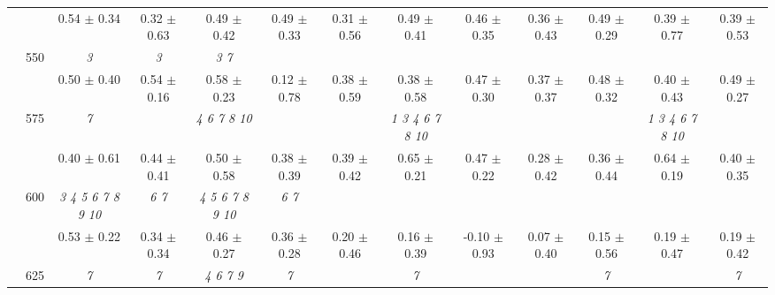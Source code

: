 \begin{table}[h]
{\begin{tabular}{
        ccccccccccccc}
 & & \cellcolor[HTML]{EFEFEF} 0.54 $\pm$ 0.34& \cellcolor[HTML]{EFEFEF} 0.32 $\pm$ 0.63& \cellcolor[HTML]{EFEFEF} 0.49 $\pm$ 0.42& \cellcolor[HTML]{EFEFEF} 0.49 $\pm$ 0.33& \cellcolor[HTML]{EFEFEF} 0.31 $\pm$ 0.56& \cellcolor[HTML]{EFEFEF} 0.49 $\pm$ 0.41& \cellcolor[HTML]{EFEFEF} 0.46 $\pm$ 0.35& \cellcolor[HTML]{EFEFEF} 0.36 $\pm$ 0.43& \cellcolor[HTML]{EFEFEF} 0.49 $\pm$ 0.29& \cellcolor[HTML]{EFEFEF} 0.39 $\pm$ 0.77& \cellcolor[HTML]{EFEFEF} 0.39 $\pm$ 0.53 \\ 
 & \multirow{2}{*}{550}& \textit{ 3 }& \textit{ 3 }& \textit{ 3 7 }& & & & & & & &  \\ 
 & & 0.50 $\pm$ 0.40& 0.54 $\pm$ 0.16& 0.58 $\pm$ 0.23& 0.12 $\pm$ 0.78& 0.38 $\pm$ 0.59& 0.38 $\pm$ 0.58& 0.47 $\pm$ 0.30& 0.37 $\pm$ 0.37& 0.48 $\pm$ 0.32& 0.40 $\pm$ 0.43& 0.49 $\pm$ 0.27 \\ 
 & \multirow{2}{*}{575}& \cellcolor[HTML]{EFEFEF} \textit{ 7 }& \cellcolor[HTML]{EFEFEF} & \cellcolor[HTML]{EFEFEF} \textit{  4  6  7  8 10 }& \cellcolor[HTML]{EFEFEF} & \cellcolor[HTML]{EFEFEF} & \cellcolor[HTML]{EFEFEF} \textit{  1  3  4  6  7  8 10 }& \cellcolor[HTML]{EFEFEF} & \cellcolor[HTML]{EFEFEF} & \cellcolor[HTML]{EFEFEF} & \cellcolor[HTML]{EFEFEF} \textit{  1  3  4  6  7  8 10 }& \cellcolor[HTML]{EFEFEF}  \\ 
 & & \cellcolor[HTML]{EFEFEF} 0.40 $\pm$ 0.61& \cellcolor[HTML]{EFEFEF} 0.44 $\pm$ 0.41& \cellcolor[HTML]{EFEFEF} 0.50 $\pm$ 0.58& \cellcolor[HTML]{EFEFEF} 0.38 $\pm$ 0.39& \cellcolor[HTML]{EFEFEF} 0.39 $\pm$ 0.42& \cellcolor[HTML]{EFEFEF} 0.65 $\pm$ 0.21& \cellcolor[HTML]{EFEFEF} 0.47 $\pm$ 0.22& \cellcolor[HTML]{EFEFEF} 0.28 $\pm$ 0.42& \cellcolor[HTML]{EFEFEF} 0.36 $\pm$ 0.44& \cellcolor[HTML]{EFEFEF} 0.64 $\pm$ 0.19& \cellcolor[HTML]{EFEFEF} 0.40 $\pm$ 0.35 \\ 
 & \multirow{2}{*}{600}& \textit{  3  4  5  6  7  8  9 10 }& \textit{ 6 7 }& \textit{  4  5  6  7  8  9 10 }& \textit{ 6 7 }& & & & & & &  \\ 
 & & 0.53 $\pm$ 0.22& 0.34 $\pm$ 0.34& 0.46 $\pm$ 0.27& 0.36 $\pm$ 0.28& 0.20 $\pm$ 0.46& 0.16 $\pm$ 0.39& -0.10 $\pm$ 0.93& 0.07 $\pm$ 0.40& 0.15 $\pm$ 0.56& 0.19 $\pm$ 0.47& 0.19 $\pm$ 0.42 \\ 
 & \multirow{2}{*}{625}& \cellcolor[HTML]{EFEFEF} \textit{ 7 }& \cellcolor[HTML]{EFEFEF} \textit{ 7 }& \cellcolor[HTML]{EFEFEF} \textit{ 4 6 7 9 }& \cellcolor[HTML]{EFEFEF} \textit{ 7 }& \cellcolor[HTML]{EFEFEF} & \cellcolor[HTML]{EFEFEF} \textit{ 7 }& \cellcolor[HTML]{EFEFEF} & \cellcolor[HTML]{EFEFEF} & \cellcolor[HTML]{EFEFEF} \textit{ 7 }& \cellcolor[HTML]{EFEFEF} & \cellcolor[HTML]{EFEFEF} \textit{ 7 } \\ 

\end{tabular}}
\end{table}
